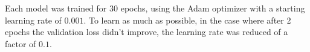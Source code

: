 Each model was trained for 30 epochs, using the Adam optimizer with a starting learning rate of $0.001$. To learn as much as possible, in the case where after 2 epochs the validation loss didn't improve, the learning rate was reduced of a factor of $0.1$.

%
%
%
%
